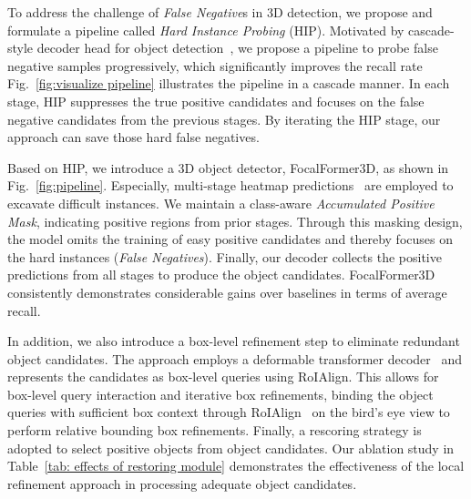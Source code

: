 \documentclass[10pt,twocolumn,letterpaper]{article}
\begin{document}
To address the challenge of \textit{False Negative}s in 3D detection, we propose and formulate a pipeline called \textit{Hard Instance Probing} (HIP). Motivated by cascade-style decoder head for object detection~\cite{cascadercnn, deformabledetr, dndetr}, we propose a pipeline to probe false negative samples progressively, which significantly improves the recall rate Fig.~\ref{fig:visualize pipeline} illustrates the pipeline in a cascade manner. In each stage, HIP suppresses the true positive candidates and focuses on the false negative candidates from the previous stages. By iterating the HIP stage, our approach can save those hard false negatives.

Based on HIP, we introduce a 3D object detector, FocalFormer3D, as shown in Fig.~\ref{fig:pipeline}. Especially, multi-stage heatmap predictions~\cite{centerpoint, centernet} are employed to excavate difficult instances. We maintain a class-aware \textit{Accumulated Positive Mask}, indicating positive regions from prior stages. Through this masking design, the model omits the training of easy positive candidates and thereby focuses on the hard instances (\textit{False Negatives}). Finally, our decoder collects the positive predictions from all stages to produce the object candidates. FocalFormer3D consistently demonstrates considerable gains over baselines in terms of average recall. 








In addition, we also introduce a box-level refinement step to eliminate redundant object candidates. The approach employs a deformable transformer decoder~\cite{deformabledetr} and represents the candidates as box-level queries using RoIAlign. This allows for box-level query interaction and iterative box refinements, binding the object queries with sufficient box context through RoIAlign~\cite{maskrcnn, fasterrcnn} on the bird's eye view to perform relative bounding box refinements. Finally, a rescoring strategy is adopted to select positive objects from object candidates. Our ablation study in Table~\ref{tab: effects of restoring module} demonstrates the effectiveness of the local refinement approach in processing adequate object candidates.
\end{document}

